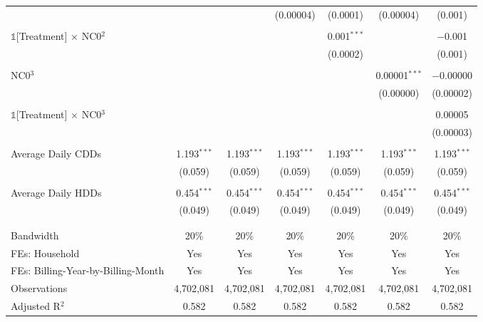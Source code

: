 {\begin{table}[t!]
\begin{adjustbox}{scale = 0.9}
\begin{threeparttable}
\begin{tabular}{@{\extracolsep{15pt}}lcccccc}
                    &  &  & (0.00004) & (0.0001) & (0.00004) & (0.001) \\ 
                    & & & & & & \\ 
                    $\mathbb{1}$[Treatment] $\times$ NC0$^{2}$ &  &  &  & 0.001$^{***}$ &  & $-$0.001 \\ 
                    &  &  &  & (0.0002) &  & (0.001) \\ 
                    & & & & & & \\ 
                    NC0$^{3}$ &  &  &  &  & 0.00001$^{***}$ & $-$0.00000 \\ 
                    &  &  &  &  & (0.00000) & (0.00002) \\ 
                    & & & & & & \\ 
                    $\mathbb{1}$[Treatment] $\times$ NC0$^{3}$ &  &  &  &  &  & 0.00005 \\ 
                    &  &  &  &  &  & (0.00003) \\ 
                    & & & & & & \\ 
                    Average Daily CDDs & 1.193$^{***}$ & 1.193$^{***}$ & 1.193$^{***}$ & 1.193$^{***}$ & 1.193$^{***}$ & 1.193$^{***}$ \\ 
                    & (0.059) & (0.059) & (0.059) & (0.059) & (0.059) & (0.059) \\ 
                    & & & & & & \\ 
                    Average Daily HDDs & 0.454$^{***}$ & 0.454$^{***}$ & 0.454$^{***}$ & 0.454$^{***}$ & 0.454$^{***}$ & 0.454$^{***}$ \\ 
                    & (0.049) & (0.049) & (0.049) & (0.049) & (0.049) & (0.049) \\ 
                    & & & & & & \\
                    \hline
                    \\[-2.0ex]
                    Bandwidth & 20\% & 20\% & 20\% & 20\% & 20\% & 20\% \\ 
                    FEs: Household & Yes & Yes & Yes & Yes & Yes & Yes \\ 
                    FEs: Billing-Year-by-Billing-Month & Yes & Yes & Yes & Yes & Yes & Yes \\ 
                    Observations & 4,702,081 & 4,702,081 & 4,702,081 & 4,702,081 & 4,702,081 & 4,702,081 \\ 
                    Adjusted R$^{2}$ & 0.582 & 0.582 & 0.582 & 0.582 & 0.582 & 0.582 \\  

\end{tabular}
\end{threeparttable}
\end{adjustbox}
\end{table}}
